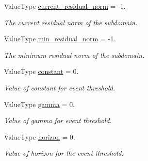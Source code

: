\begin{DoxyCompactItemize}
Value\+Type \hyperlink{structschwz_1_1Metadata_a3436901bfcd4f17f65ed3acb810a7909}{current\+\_\+residual\+\_\+norm} = -\/1.
\begin{DoxyCompactList}\small\item\em The current residual norm of the subdomain. \end{DoxyCompactList}\item 
\mbox{\label{structschwz_1_1Metadata_a04bd75fb60c4085481a3fc3e96269452}} 
Value\+Type \hyperlink{structschwz_1_1Metadata_a04bd75fb60c4085481a3fc3e96269452}{min\+\_\+residual\+\_\+norm} = -\/1.
\begin{DoxyCompactList}\small\item\em The minimum residual norm of the subdomain. \end{DoxyCompactList}\item 
\mbox{\label{structschwz_1_1Metadata_aed13edafeb7b695ab134a594957b08da}} 
Value\+Type \hyperlink{structschwz_1_1Metadata_aed13edafeb7b695ab134a594957b08da}{constant} = 0.
\begin{DoxyCompactList}\small\item\em Value of constant for event threshold. \end{DoxyCompactList}\item 
\mbox{\label{structschwz_1_1Metadata_a3e6d7acc51f4dd26e50b2dc902a92d1e}} 
Value\+Type \hyperlink{structschwz_1_1Metadata_a3e6d7acc51f4dd26e50b2dc902a92d1e}{gamma} = 0.
\begin{DoxyCompactList}\small\item\em Value of gamma for event threshold. \end{DoxyCompactList}\item 
\mbox{\label{structschwz_1_1Metadata_a9c12719250c5c44ca3096af308d93e4c}} 
Value\+Type \hyperlink{structschwz_1_1Metadata_a9c12719250c5c44ca3096af308d93e4c}{horizon} = 0.
\begin{DoxyCompactList}\small\item\em Value of horizon for the event threshold. \end{DoxyCompactList}\item 
\mbox{\label{structschwz_1_1Metadata_a2b400902089b06b47f230306b51252d5}} 

\end{DoxyCompactItemize}
